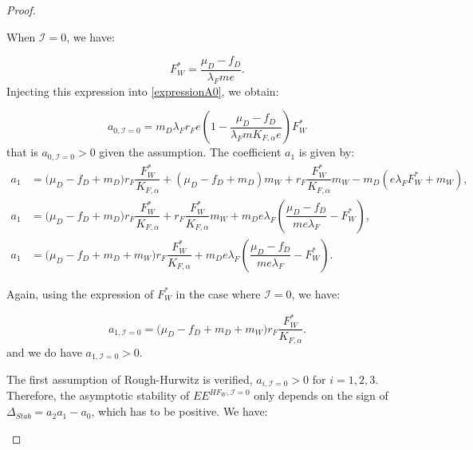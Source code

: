 \documentclass{article}
\newcommand{\lfw}{\lambda_{F}}
\newcommand{\lfw}{\lambda_{F}}
\newcommand{\Kfa}{K_{F,\alpha}}
\newcommand{\cI}{\mathcal{I}}
\begin{document}
\begin{proof}
\begin{itemize}
When $\cI = 0$, we have:

\begin{equation*}
F_W^* = \dfrac{\mu_D - f_D}{\lfw m e}.
\end{equation*} 
Injecting this expression into \eqref{expressionA0}, we obtain:

\begin{equation*}
a_{0, \cI=0} = m_D \lfw r_F e\left(1 - \dfrac{\mu_D - f_D}{\lfw m \Kfa e } \right) F_W^*
\end{equation*}
that is $a_{0, \cI=0}>0$ given the assumption. The coefficient $a_1$ is given by:
\begin{subequations}
\begin{align}
a_1 &= \big( \mu_D  -f_D + m_D) r_F \dfrac{F^*_W}{K_{F, \alpha}} + (\mu_D -f_D + m_D) m_W + r_F \dfrac{F_W^*}{K_{F, \alpha}} m_W - m_D (e\lfw F^*_W + m_W), \\
a_1 &= \big( \mu_D -f_D + m_D) r_F \dfrac{F^*_W}{K_{F, \alpha}}  + r_F \dfrac{F_W^*}{K_{F, \alpha}} m_W + m_D e\lfw   \left(\dfrac{\mu_D - f_D}{m e\lfw} - F^*_W \right),  \\
a_1 &= \big( \mu_D -f_D + m_D + m_W) r_F \dfrac{F^*_W}{K_{F, \alpha}}   + m_D e\lfw   \left(\dfrac{\mu_D - f_D}{m e\lfw} - F^*_W \right). \label{expressionA1}
\end{align}
\end{subequations}

Again, using the expression of $F^*_W$ in the case where $\cI = 0$, we have:

\begin{equation*}
a_{1, \cI =0} = \big( \mu_D -f_D + m_D + m_W) r_F \dfrac{F^*_W}{K_{F, \alpha}}.
\end{equation*}
and we do have $a_{1, \cI =0} > 0$.

The first assumption of Rough-Hurwitz is verified, $a_{i, \cI =0} > 0$ for $i=1,2,3$. Therefore, the asymptotic stability of $EE^{HF_W,  \cI =0}$ only depends on the sign of $\Delta_{Stab}= a_2 a_1 - a_0$, which has to be positive. We have:


\end{itemize}
\end{proof}
\end{document}
